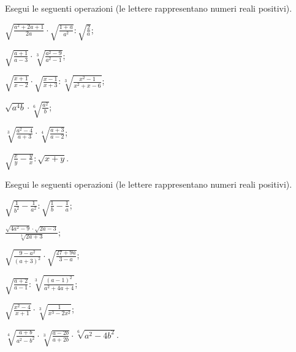 \begin{esercizio}[\Ast]
 \label{ese:2.41}
Esegui le seguenti operazioni (le lettere rappresentano numeri reali positivi).
 \begin{multicols}{2}
 \begin{enumeratea}
 \item $\sqrt{\frac{a^2+2a+1}{2a}}\cdot \sqrt{\frac{1+a}{a^2}}:\sqrt{\frac 2 a}$;
 \item $\sqrt{\frac{a+1}{a-3}}\cdot \sqrt[3]{\frac{a^2-9}{a^2-1}}$;
 \item $\sqrt{\frac{x+1}{x-2}}\cdot \sqrt{\frac{x-1}{x+3}}:\sqrt[3]{\frac{x^2-1}{x^2+x-6}}$;
 \item $\sqrt{a^4b}\cdot \sqrt[6]{\frac{a^2} b}$;
 \item $\sqrt[3]{\frac{a^2-4}{a+3}}\cdot \sqrt[4]{\frac{a+3}{a-2}}$;
 \item $\sqrt{\frac x y-\frac y x}:\sqrt{x+y}$.
 \end{enumeratea}
 \end{multicols}
\end{esercizio}

\begin{esercizio}[\Ast]
 \label{ese:2.42}
Esegui le seguenti operazioni (le lettere rappresentano numeri reali positivi).
 \begin{multicols}{2}
 \begin{enumeratea}
 \item $\sqrt{\frac 1{b^2}-\frac 1{a^2}}:\sqrt{\frac 1 b-\frac 1 a}$;
 \item $\frac{\sqrt{4a^2-9}\cdot \sqrt{2a-3}}{\sqrt[3]{2a+3}}$;
 \item $\sqrt{\frac{9-a^2}{(a+3)^2}}\cdot \sqrt{\frac{27+9a}{3-a}}$;
 \item $\sqrt{\frac{a+2}{a-1}}:\sqrt[3]{\frac{(a-1)^2}{a^2+4a+4}}$;
 \item $\sqrt{\frac{x^2-4}{x+1}}\cdot \sqrt[3]{\frac 1{x^3-2x^2}}$;
 \item $\sqrt[4]{\frac{a+b}{a^2-b^2}}\cdot \sqrt[3]{\frac{a-2b}{a+2b}}\cdot \sqrt[6]{a^2-4b^2}$.
 \end{enumeratea}
 \end{multicols}
\end{esercizio}

